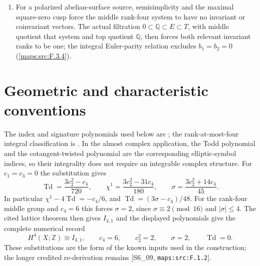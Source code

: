 \documentclass[11pt,a4paper]{article}
\theoremstyle{definition}
\providecommand{\vir}{\mathrm{vir}}
\begin{document}
\begin{enumerate}[label=\arabic*.]
  singular-value bound put a spanning tube in the unpolarized period
  domain.  The verified local-spray approximation theorem, with the
  relative extension-point argument proved here, produces a
  holomorphic transverse period section and retains any prescribed
  bounded cusp jet (\cref{maps:src:F.3.8}, \cref{maps:src:F.3.10}, \cref{maps:src:F.3.11}).
\item For a polarized abelian-surface source, semisimplicity and the
  maximal square-zero cusp force the middle rank-four system to have
  no invariant or coinvariant vectors.  The actual filtration
  $0\subset\mathbb Q\subset E\subset T$, with middle quotient that
  system and top quotient $\mathbb Q$, then forces both relevant
  invariant ranks to be one; the integral Euler-parity relation
  excludes $b_1=b_2=0$ (\cref{maps:src:F.3.4}).
\end{enumerate}

\providecommand{\LL}{\mathcal L}
\providecommand{\cT}{\mathcal T}
\providecommand{\HP}{\mathbb H\mathbb P}
\providecommand{\tr}{\operatorname{tr}}
\providecommand{\sgn}{\operatorname{sgn}}
\providecommand{\vir}{\mathrm{vir}}

\section{Geometric and characteristic conventions}\label{sec:V-known-inputs}
The index and signature polynomials used below are
\cite[equations (1.2)--(1.4), pp.~3--4]{ffEsoleKang}; the
rank-at-most-four integral classification is
\cite[Theorem 2.2.1, p.~61]{ffPetersSterk}.  In the almost
complex application, the Todd polynomial and the cotangent-twisted
polynomial are the corresponding elliptic-symbol indices, so their
integrality does not require an integrable complex structure.
For $c_1=c_3=0$ the substitution gives
\begin{equation}
\operatorname{Td}=\frac{3c_2^2-c_4}{720},\qquad
\chi^1=\frac{3c_2^2-31c_4}{180},\qquad
\sigma=\frac{3c_2^2+14c_4}{45}.
\label{maps:eq:F.1}
\end{equation}
In particular $\chi^1-4\operatorname{Td}=-c_4/6$, and
$\operatorname{Td}=(3\sigma-c_4)/48$.  For the rank-four middle
group and $c_4=6$ this forces $\sigma=2$, since
$\sigma\equiv2\pmod {16}$ and $|\sigma|\leq4$.
The cited lattice theorem then gives $I_{3,1}$ and the displayed
polynomials give the complete numerical record
\begin{equation}
 H^4(X;\mathbb Z)\cong I_{3,1},\qquad c_4=6,\qquad
 c_2^2=2,\qquad\sigma=2,\qquad\operatorname{Td}=0.
 \label{maps:eq:F.2}
\end{equation}
These substitutions are the form of the known inputs used in
the construction; the longer credited re-derivation remains
[S6\_09, \nolinkurl{maps:src:F.1.2}].
\end{document}
